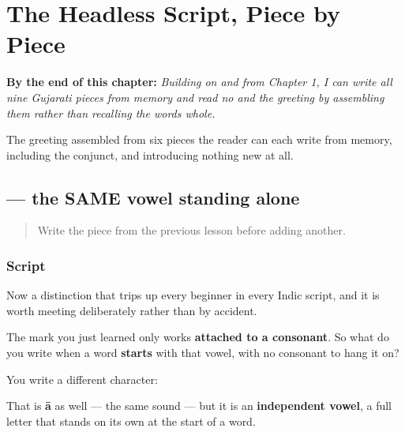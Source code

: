 
\chapter{The Headless Script, Piece by Piece}
\label{ch:gu-script-first}

\begin{chapteropening}
\textbf{By the end of this chapter:} \emph{Building on  and  from Chapter 1, I can write all nine Gujarati pieces from memory and read no and the greeting by assembling them rather than recalling the words whole.}

The greeting assembled from six pieces the reader can each write from memory, including the conjunct, and introducing nothing new at all.
\end{chapteropening}

\section[ā]{ — the SAME vowel standing alone}

\label{lesson:GU-W01-aa}



\begin{quote}
Write the piece from the previous lesson before adding another.
\end{quote}

\subsection*{Script}
Now a distinction that trips up every beginner in every Indic script, and it is worth meeting deliberately rather than by accident.

The mark you just learned only works \textbf{attached to a consonant}. So what do you write when a word \textbf{starts} with that vowel, with no consonant to hang it on?

You write a different character:

\begin{quote}
\end{quote}

That is \textbf{ā} as well — the same sound — but it is an \textbf{independent vowel}, a full letter that stands on its own at the start of a word.

